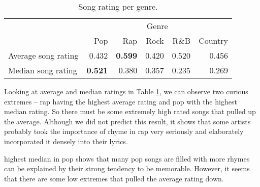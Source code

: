 \begin{table}[h!]\centering
\begin{tabular}{l r r r r r}\toprule
                    & \multicolumn{5}{c}{Genre} \\\cmidrule{2-6}
                    & Pop      & Rap      & Rock  &	R\&B  & Country\\\midrule
Average song rating &    0.432 &\bf 0.599 & 0.420 & 0.520 & 0.456 \\
Median song rating  &\bf 0.521 &    0.380 & 0.357 & 0.235 & 0.269 \\\bottomrule
\end{tabular}
\caption{Song rating per genre.} 
\label{song_rating_stats}
\end{table}

Looking at average and median  ratings in Table \ref{song_rating_stats}, we can observe two curious extremes -- rap having the highest average rating and pop with the highest median rating.
So there must be some extremely high rated  songs that pulled up the average.
Although we did not predict this result, it shows that some artists probably took the importance of rhyme in rap very seriously and elaborately incorporated it densely into their lyrics.

 highest median in pop shows that many pop songs are filled with more rhymes can be explained by their strong tendency to be memorable. However, it seems that there are some low extremes that pulled the average rating down.

